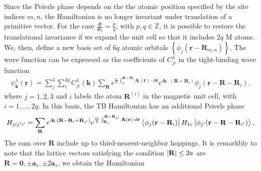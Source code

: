 \documentclass{article}
\begin{document}
Since the Peierls phase depends on the the atomic position specified by the site indices $m,n$, the Hamiltonian is no longer invariant under translation of a primitive vector. For the case $\frac{\Phi}{\Phi_{0}} = \frac{p}{q}$, with $p,q \in \mathbb{Z}$, it is possible to restore the translational invariance if we expand the unit cell so that it includes $2q$ M atoms. We, then, define a new basis set of $6q$ atomic orbitals $\left\{ \phi_{j}(\mathbf{r} - \mathbf{R}_{m,n}) \right\}$. The wave function can be expressed as the coefficients of $C_{ji}^{\lambda}$ in the tight-binding wave function
\begin{gather}
	\psi_{\mathbf{k}}^{\lambda}(\mathbf{r}) = \sum_{j}^{3}\sum_{i}^{2q} C_{ji}^{\lambda}(\mathbf{k}) \sum_{{\mathbf{R}}} e^{\frac{ie}{\hbar}\int_0^{\mathbf{R} + \mathbf{R}_{i}}\mathbf{A}(\mathbf{r})\cdot d\mathbf{r}} e^{i\mathbf{k} \cdot (\mathbf{R} + \mathbf{R}_{i}) } \phi_{j}(\mathbf{r} - \mathbf{R} - \mathbf{R}_{i}).
\end{gather}
where $j = 1,2,3$ and $i$ labels the atom $\mathbf{R}^{(i)}$ in the magnetic unit cell, with $i = 1, \ldots, 2q$. In this basis, the TB Hamiltonian has an additional Peierls phase
\begin{gather}
	H_{j i  j' i'} = \sum_{\mathbf{R}} e^{i \mathbf{k} \cdot ( \mathbf{R} - \mathbf{R}_{i} + \mathbf{R}_{i'} )} e^{\frac{ie}{\hbar} \int_{\mathbf{R}_{i}}^{\mathbf{R} + \mathbf{R}_{i'}} \mathbf{A}(\mathbf{r}) \cdot d \mathbf{r}} \bra{\phi_{j}(\mathbf{r} - \mathbf{R}_{i})} H_{1e} \ket{\phi_{j'}(\mathbf{r} - \mathbf{R} - \mathbf{R}_{i'})},
\end{gather}
The sum over $\mathbf{R}$ include up to third-nearest-neighbor hoppings. It is remarkbly to note that the lattice vectors satisfying the condition $\abs{\mathbf{R}} \leq 2a$ are $\mathbf{R} = \mathbf{0}, \pm \mathbf{a}_{1}, \pm 2 \mathbf{a}_{1}$, we obtain the Hamiltonian
\end{document}
